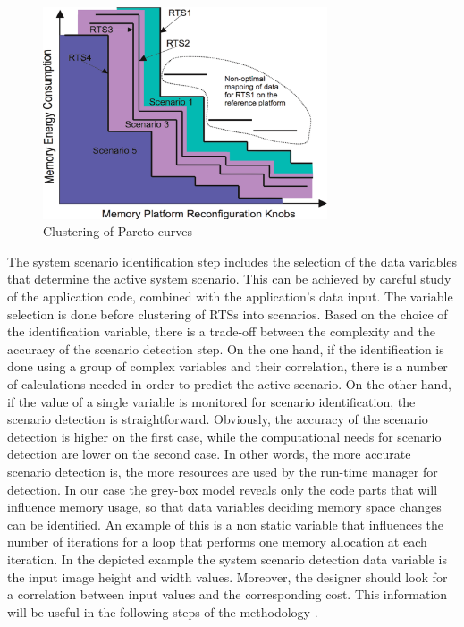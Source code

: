 \documentclass[smallcondensed]{svjour3}
\begin{document}
\begin{figure}
\centering
\includegraphics[width=0.75\textwidth]{Images/2D.eps}
\caption{Clustering of Pareto curves}
\label{fig:pareto}
\end{figure}

The system scenario identification step includes the selection of the data variables that determine the active system scenario. 
This can be achieved by careful study of the application code, combined with the application's data input.
The variable selection is done before clustering of RTSs into scenarios.
Based on the choice of the identification variable, there is a trade-off between the complexity and the accuracy of the scenario detection step.
On the one hand, if the identification is done using a group of complex variables and their correlation, there is a number of calculations needed in order to predict the active scenario. 
On the other hand, if the value of a single variable is monitored for scenario identification, the scenario detection is straightforward.
Obviously, the accuracy of the scenario detection is higher on the first case, while the computational needs for scenario detection are lower on the second case.
In other words, the more accurate scenario detection is, the more resources are used by the run-time manager for detection.
In our case the grey-box model reveals only the code parts that will influence memory usage, so that data variables deciding memory space changes can be identified. 
An example of this is a non static variable that influences the number of iterations for a loop that performs one memory allocation at each iteration. 
In the depicted example the system scenario detection data variable is the input image height and width values. 
Moreover, the designer should look for a correlation between input values and the corresponding cost. 
This information will be useful in the following steps of the methodology \cite{tcm}.
\end{document}
